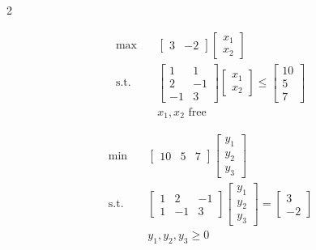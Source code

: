 \begin{multicols}{2}
\begin{tcolorbox}[title=Primal (P), colback=blue!5, colframe=blue!60!black, sharp corners=south]
\[
\begin{aligned}
\max \quad &
\begin{bmatrix} 3 & -2 \end{bmatrix}
\begin{bmatrix} x_1 \\ x_2 \end{bmatrix} \\[0.5em]
\text{s.t.} \quad &
\begin{bmatrix}
1 & 1 \\
2 & -1 \\
-1 & 3
\end{bmatrix}
\begin{bmatrix} x_1 \\ x_2 \end{bmatrix}
\leq
\begin{bmatrix} 10 \\ 5 \\ 7 \end{bmatrix} \\[0.5em]
& x_1, x_2 \text{ free}
\end{aligned}
\]
\end{tcolorbox}

\columnbreak

\begin{tcolorbox}[title=Dual (D), colback=green!5, colframe=green!60!black, sharp corners=south]
\[
\begin{aligned}
\min \quad &
\begin{bmatrix} 10 & 5 & 7 \end{bmatrix}
\begin{bmatrix} y_1 \\ y_2 \\ y_3 \end{bmatrix} \\[0.5em]
\text{s.t.} \quad &
\begin{bmatrix}
1 & 2 & -1 \\
1 & -1 & 3
\end{bmatrix}
\begin{bmatrix} y_1 \\ y_2 \\ y_3 \end{bmatrix}
=
\begin{bmatrix} 3 \\ -2 \end{bmatrix} \\[0.5em]
& y_1, y_2, y_3 \geq 0
\end{aligned}
\]
\end{tcolorbox}
\end{multicols}



